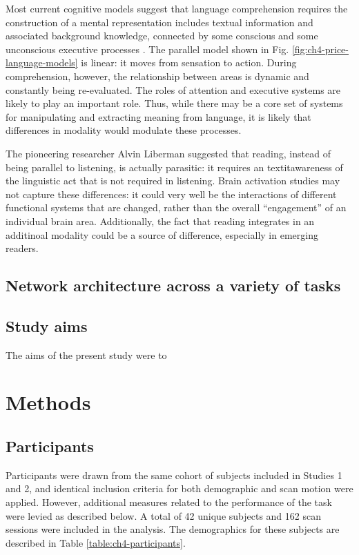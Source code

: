 Most current cognitive models suggest that language comprehension requires the construction of a mental representation includes textual information and associated background knowledge, connected by some conscious and some unconscious executive processes \citep{Kendeou2014}. The parallel model shown in Fig. \ref{fig:ch4-price-language-models} is linear: it moves from sensation to action. During comprehension, however, the relationship between areas is dynamic and constantly being re-evaluated. The roles of attention and executive systems are likely to play an important role. Thus, while there may be a core set of systems for manipulating and extracting meaning from language, it is likely that differences in modality would modulate these processes. 

The pioneering researcher Alvin Liberman suggested that reading, instead of being parallel to listening, is actually parasitic: it requires an textit{awareness} of the linguistic act that is not required in listening. Brain activation studies may not capture these differences: it could very well be the interactions of different functional systems that are changed, rather than the overall ``engagement'' of an individual brain area. Additionally, the fact that reading integrates in an additinoal modality could be a source of difference, especially in emerging readers. 

\subsection{Network architecture across a variety of tasks}

\subsection{Study aims}

The aims of the present study were to 

\section{Methods}

\subsection{Participants}

Participants were drawn from the same cohort of subjects included in Studies 1 and 2, and identical inclusion criteria for both demographic and scan motion were applied. However, additional measures related to the performance of the task were levied as described below. A total of 42 unique subjects and 162 scan sessions were included in the analysis. The demographics for these subjects are described in Table \ref{table:ch4-participants}.

